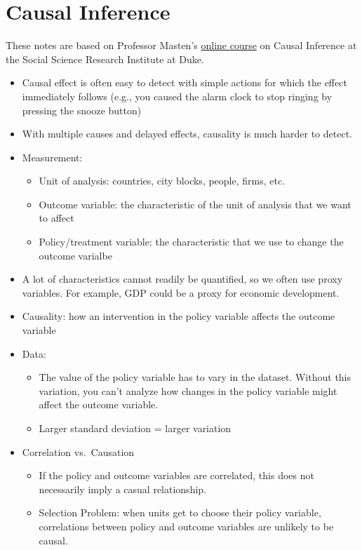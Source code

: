 \documentclass[]{book}
\providecommand{\tightlist}{%
  \setlength{\itemsep}{0pt}\setlength{\parskip}{0pt}}
\begin{document}
\hypertarget{causal-inference}{%
\section*{Causal Inference}\label{causal-inference}}

These notes are based on Professor Masten's \href{https://modu.ssri.duke.edu/topic/introduction-causal-inference}{online course} on Causal Inference at the Social Science Research Institute at Duke.

\begin{itemize}
\item
  Causal effect is often easy to detect with simple actions for which the effect immediately follows (e.g., you caused the alarm clock to stop ringing by pressing the snooze button)
\item
  With multiple causes and delayed effects, causality is much harder to detect.
\item
  Measurement:

  \begin{itemize}
  \tightlist
  \item
    Unit of analysis: countries, city blocks, people, firms, etc.
  \item
    Outcome variable: the characteristic of the unit of analysis that we want to affect
  \item
    Policy/treatment variable: the characteristic that we use to change the outcome varialbe
  \end{itemize}
\item
  A lot of characteristics cannot readily be quantified, so we often use proxy variables. For example, GDP could be a proxy for economic development.
\item
  Causality: how an intervention in the policy variable affects the outcome variable
\item
  Data:

  \begin{itemize}
  \tightlist
  \item
    The value of the policy variable has to vary in the dataset. Without this variation, you can't analyze how changes in the policy variable might affect the outcome variable.
  \item
    Larger standard deviation = larger variation
  \end{itemize}
\item
  Correlation vs.~Causation

  \begin{itemize}
  \tightlist
  \item
    If the policy and outcome variables are correlated, this does not necessarily imply a casual relationship.
  \item
    Selection Problem: when units get to choose their policy variable, correlations between policy and outcome variables are unlikely to be causal.


\end{itemize}
\end{itemize}
\end{document}
